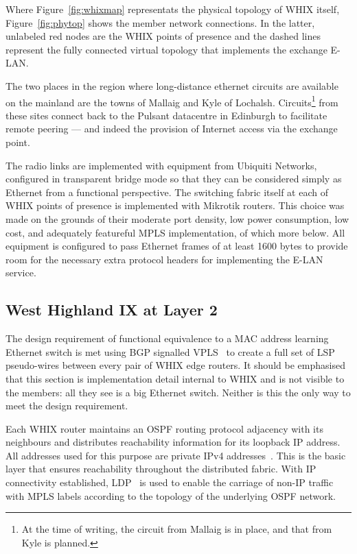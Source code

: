 Where Figure~\ref{fig:whixmap} representats the physical topology
of \ac{WHIX} itself, Figure~\ref{fig:phytop} shows the member network
connections. In the latter, unlabeled red nodes are the \ac{WHIX}
points of presence and the dashed lines represent the fully connected
virtual topology that implements the exchange E-LAN.

The two places in the region where long-distance ethernet circuits are
available on the mainland are the towns of Mallaig and Kyle of
Lochalsh. Circuits\footnote{At the time of writing, the circuit from
Mallaig is in place, and that from Kyle is planned.} from these sites
connect back to the Pulsant datacentre in Edinburgh to facilitate
remote peering --- and indeed the provision of Internet access via the
exchange point.

The radio links are implemented with equipment from Ubiquiti Networks,
configured in transparent bridge mode so that they can be considered
simply as Ethernet from a functional perspective. The switching fabric
itself at each of \ac{WHIX} points of presence is implemented with
Mikrotik routers. This choice was made on the grounds of their
moderate port density, low power consumption, low cost, and adequately
featureful \ac{MPLS} implementation, of which more below. All
equipment is configured to pass Ethernet frames of at least 1600 bytes
to provide room for the necessary extra protocol headers for
implementing the E-LAN service.

\subsection{West Highland IX at Layer 2}
\label{sec:bgpvpls}

The design requirement of functional equivalence to a \ac{MAC} address
learning Ethernet switch is met using \ac{BGP}
signalled \ac{VPLS}~\cite{rfc4761} to create a full set of \ac{LSP}
pseudo-wires between every pair of \ac{WHIX} edge routers. It should
be emphasised that this section is implementation detail internal
to \ac{WHIX} and is not visible to the members: all they see is a
big Ethernet switch. Neither is this the only way to meet the design
requirement. 

Each \ac{WHIX} router maintains an \ac{OSPF} routing protocol
adjacency with its neighbours and distributes reachability information
for its loopback IP address. All addresses used for this purpose are
private IPv4 addresses~\cite{rfc1918}. This is the basic layer that
ensures reachability throughout the distributed fabric. With IP
connectivity established, \ac{LDP}~\cite{rfc5036} is used to enable
the carriage of non-IP traffic with \ac{MPLS} labels according to the
topology of the underlying \ac{OSPF} network.

